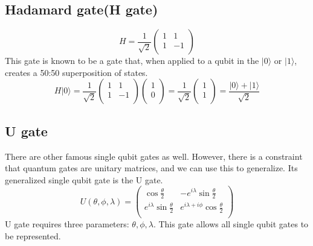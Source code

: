 \subsection*{Hadamard gate(H gate)}
\begin{equation}
    H = \frac{1}{\sqrt{2}}
    \begin{pmatrix}
        1 & 1\\
        1 & -1\\
    \end{pmatrix}
\end{equation}
This gate is known to be a gate that, when applied to a qubit in the $|0\rangle$ or $|1\rangle$, creates a 50:50 superposition of states.
\begin{equation}
    H |0\rangle =
    \frac{1}{\sqrt{2}}
    \begin{pmatrix}
        1 & 1\\
        1 & -1\\
    \end{pmatrix}
    \begin{pmatrix}
        1 \\
        0 \\
    \end{pmatrix} = 
    \frac{1}{\sqrt{2}}
    \begin{pmatrix}
        1 \\
        1 \\
    \end{pmatrix} =  \frac{|0\rangle + |1\rangle}{\sqrt{2}}
\end{equation}

\subsection*{U gate}
There are other famous single qubit gates as well.
However, there is a constraint that quantum gates are unitary matrices, and we can use this to generalize.
Its generalized single qubit gate is the U gate.
\begin{equation}
    U(\theta, \phi, \lambda) = 
    \begin{pmatrix}
        \cos{\frac{\theta}{2}} & -e^{i\lambda} \sin{\frac{\theta}{2}}\\
        e^{i\lambda} \sin{\frac{\theta}{2}} & e^{i\lambda+i\phi} \cos{\frac{\theta}{2}}\\
    \end{pmatrix}
\end{equation}
U gate requires three parameters: $\theta, \phi, \lambda$.
This gate allows all single qubit gates to be represented.

